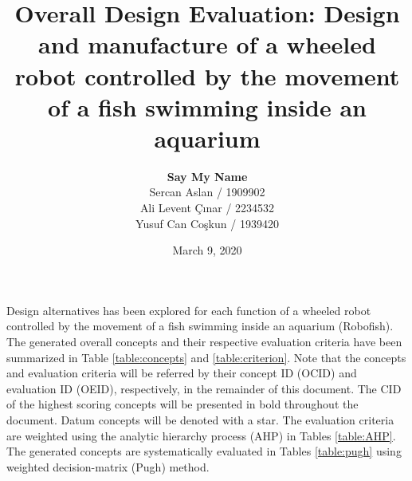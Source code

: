 \documentclass[a4paper, 10pt, DIV=16, parskip = full, twocolumn = true]{scrartcl}
\title{Overall Design Evaluation: Design and manufacture of a wheeled robot controlled by the movement of a fish swimming inside an aquarium}
\author{\textbf{Say My Name} \\ Sercan Aslan / 1909902 \\ Ali Levent Çınar / 2234532 \\ Yusuf Can Coşkun / 1939420}
\date{March 9, 2020}
\begin{document}
	\maketitle
	\thispagestyle{scrheadings}


\begin{strip}
	Design alternatives has been explored for each function of a wheeled robot controlled by the movement of a fish swimming inside an aquarium (Robofish). The generated overall concepts and their respective evaluation criteria have been summarized in Table \ref{table:concepts} and \ref{table:criterion}. Note that the concepts and evaluation criteria will be referred by their concept ID (OCID) and evaluation ID (OEID), respectively, in the remainder of this document. The CID of the highest scoring concepts will be presented in bold throughout the document. Datum concepts will be denoted with a star. The evaluation criteria are weighted using the analytic hierarchy process (AHP) in Tables \ref{table:AHP}. The generated concepts are systematically evaluated in Tables \ref{table:pugh} using weighted decision-matrix (Pugh) method.
\end{strip}

\end{document}
